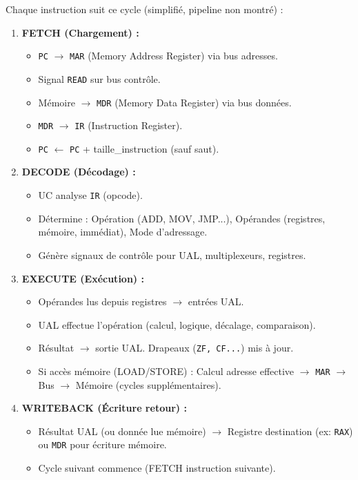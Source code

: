 \documentclass[11pt]{article}
\begin{document}
\begin{methode}
Chaque instruction suit ce cycle (simplifié, pipeline non montré) :
\begin{enumerate}
    \item \textbf{FETCH (Chargement) :}
    \begin{itemize}
        \item \texttt{PC} $\to$ \texttt{MAR} (Memory Address Register) via bus adresses.
        \item Signal \texttt{READ} sur bus contrôle.
        \item Mémoire $\to$ \texttt{MDR} (Memory Data Register) via bus données.
        \item \texttt{MDR} $\to$ \texttt{IR} (Instruction Register).
        \item \texttt{PC} $\leftarrow$ \texttt{PC} + taille\_instruction (sauf saut).
    \end{itemize}
    \item \textbf{DECODE (Décodage) :}
    \begin{itemize}
        \item UC analyse \texttt{IR} (opcode).
        \item Détermine : Opération (ADD, MOV, JMP...), Opérandes (registres, mémoire, immédiat), Mode d'adressage.
        \item Génère signaux de contrôle pour UAL, multiplexeurs, registres.
    \end{itemize}
    \item \textbf{EXECUTE (Exécution) :}
    \begin{itemize}
        \item Opérandes lus depuis registres $\to$ entrées UAL.
        \item UAL effectue l'opération (calcul, logique, décalage, comparaison).
        \item Résultat $\to$ sortie UAL. Drapeaux (\texttt{ZF, CF...}) mis à jour.
        \item Si accès mémoire (LOAD/STORE) : Calcul adresse effective $\to$ \texttt{MAR} $\to$ Bus $\to$ Mémoire (cycles supplémentaires).
    \end{itemize}
    \item \textbf{WRITEBACK (Écriture retour) :}
    \begin{itemize}
        \item Résultat UAL (ou donnée lue mémoire) $\to$ Registre destination (ex: \texttt{RAX}) ou \texttt{MDR} pour écriture mémoire.
        \item Cycle suivant commence (FETCH instruction suivante).
    \end{itemize}
\end{enumerate}
\end{methode}
\end{document}
